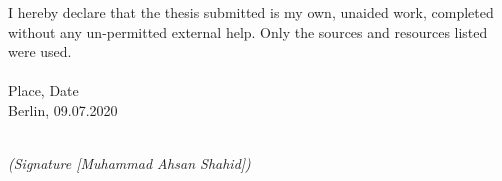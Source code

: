 \newpage

\thispagestyle{empty}

\begin{large}

\vspace*{6cm}

\noindent
I hereby declare that the thesis submitted is my own, unaided work, completed
without any un-permitted external help. Only the sources and resources listed were
used.
\\
\\

\noindent
Place, Date
\\

\noindent
Berlin, 09.07.2020

\vspace{3cm}

\hspace*{7cm}%
\dotfill\\
\hspace*{8.5cm}%
\textit{(Signature [Muhammad Ahsan Shahid])}

\end{large}
